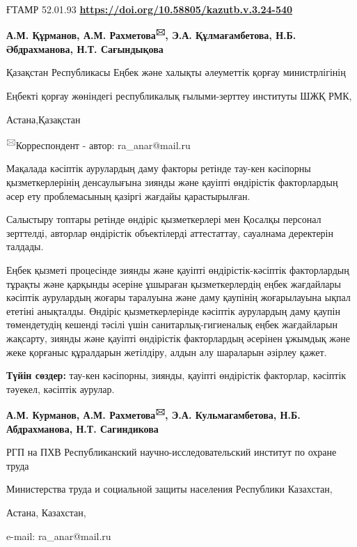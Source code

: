 \newpage
ҒТАМР 52.01.93
\hfill {\bfseries \href{https://doi.org/10.58805/kazutb.v.3.24-540}{https://doi.org/10.58805/kazutb.v.3.24-540}}


\begin{center}
{\bfseries А.М. Құрманов, А.М. Рахметова\textsuperscript{🖂}, Э.А. Құлмағамбетова, Н.Б. Әбдрахманова, Н.Т. Сағындықова}

Қазақстан Республикасы Еңбек және халықты әлеуметтік қорғау
министрлігінің

Еңбекті қорғау жөніндегі республикалық ғылыми-зерттеу институты ШЖҚ РМК,

Астана,Қазақстан

\textsuperscript{🖂}Корреспондент - автор: ra\_anar@mail.ru
\end{center}

Мақалада кәсіптік аурулардың даму факторы ретінде тау-кен кәсіпорны
қызметкерлерінің денсаулығына зиянды және қауіпті өндірістік
факторлардың әсер ету проблемасының қазіргі жағдайы қарастырылған.

Салыстыру топтары ретінде өндіріс қызметкерлері мен Қосалқы персонал
зерттелді, авторлар өндірістік объектілерді аттестаттау, сауалнама
деректерін талдады.

Еңбек қызметі процесінде зиянды және қауіпті өндірістік-кәсіптік
факторлардың тұрақты және қарқынды әсеріне ұшыраған қызметкерлердің
еңбек жағдайлары кәсіптік аурулардың жоғары таралуына және даму қаупінің
жоғарылауына ықпал ететіні анықталды. Өндіріс қызметкерлерінде кәсіптік
аурулардың даму қаупін төмендетудің кешенді тәсілі үшін
санитарлық-гигиеналық еңбек жағдайларын жақсарту, зиянды және қауіпті
өндірістік факторлардың әсерінен ұжымдық және жеке қорғаныс құралдарын
жетілдіру, алдын алу шараларын әзірлеу қажет.

{\bfseries Түйін сөздер:} тау-кен кәсіпорны, зиянды, қауіпті өндірістік
факторлар, кәсіптік тәуекел, кәсіптік аурулар.


\begin{center}
{\bfseries А.М. Курманов, А.М. Рахметова\textsuperscript{🖂}, Э.А. Кульмагамбетова, Н.Б. Абдрахманова, Н.Т. Сагиндикова}

РГП на ПХВ Республиканский научно-исследовательский институт по охране
труда

Министерства труда и социальной защиты населения Республики Казахстан,

Астана, Казахстан,

e-mail: ra\_anar@mail.ru
\end{center}

